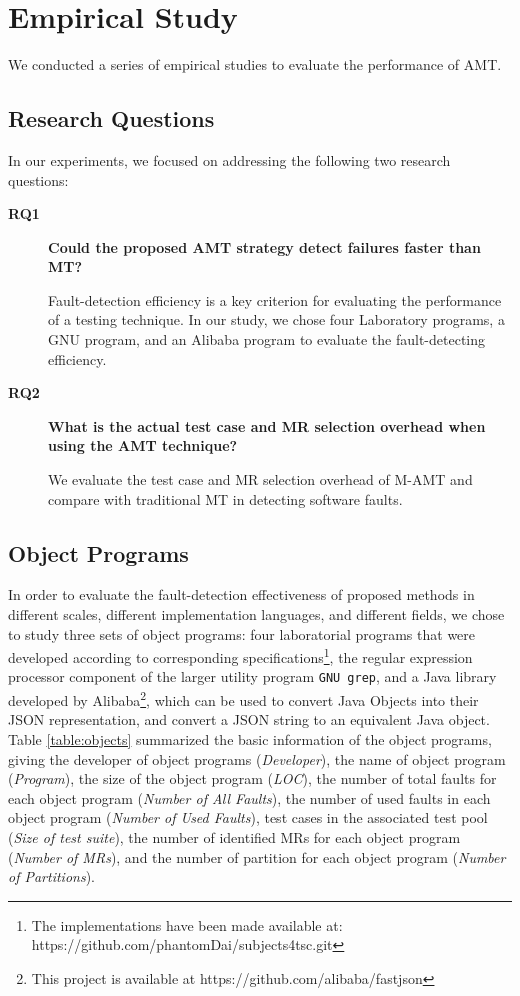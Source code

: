 \documentclass[10pt,journal,compsoc]{IEEEtran}
\begin{document}
\section{Empirical Study}
\label{sec:empiricalStudy}

We conducted a series of empirical studies to evaluate the performance of AMT.

\subsection{Research Questions}
\label{sec:rqs}
In our experiments, we focused on addressing the following two research questions:
\begin{description}
  \item [\textbf{RQ1}] \textbf{Could the proposed AMT strategy detect failures faster than MT?}

  Fault-detection efficiency is a key criterion for evaluating the performance of a testing technique. In our study, we chose four Laboratory programs, a GNU program, and an Alibaba program to evaluate the fault-detecting efficiency.

  \item [\textbf{RQ2}] \textbf{What is the actual test case and MR selection overhead when using the AMT technique?}

  We evaluate the test case and MR selection overhead of M-AMT and compare with traditional MT in detecting software faults.
\end{description}

\subsection{Object Programs}
\label{sec:programs}

In order to evaluate the fault-detection effectiveness of proposed methods in different scales, different implementation languages, and different fields, we chose to study three sets of object programs: four laboratorial programs that were developed according to corresponding specifications\footnote{The implementations have been made available at: https://github.com/phantomDai/subjects4tsc.git}, the regular expression processor component of the larger utility program \texttt{GNU grep}, and a Java library developed by Alibaba\footnote{This project is available at https://github.com/alibaba/fastjson}, which can be used to convert Java Objects into their JSON representation, and convert a JSON string to an equivalent Java object. Table \ref{table:objects} summarized the basic information of the object programs, giving the developer of object programs (\emph{Developer}), the name of object program (\emph{Program}), the size of the object program (\emph{LOC}), the number of total faults for each object program (\emph{Number of All Faults}), the number of used faults in each object program (\emph{Number of Used Faults}), test cases in the associated test pool (\emph{Size of test suite}), the number of identified MRs for each object program (\emph{Number of MRs}), and the number of partition for each object program (\emph{Number of Partitions}).
\end{document}
